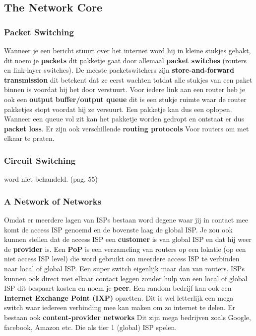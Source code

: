 \subsection{The Network Core}
\subsubsection{Packet Switching}
Wanneer je een bericht stuurt over het internet word hij in kleine stukjes gehakt, dit noem je \textbf{packets} dit pakketje gaat door allemaal \textbf{packet switches} (routers en link-layer switches).
\newline
De meeste packetswitchers zijn \textbf{store-and-forward transmission} dit betekent dat ze eerst wachten totdat alle stukjes van een paket binnen is voordat hij het door verstuurt. Voor iedere link aan een router heb je ook een \textbf{output buffer/output queue} dit is een stukje ruimte waar de router pakketjes stopt voordat hij ze versuurt. Een pakketje kan dus een  oplopen. Wanneer een queue vol zit kan het pakketje worden gedropt en ontstaat er dus \textbf{packet loss}.
\newline
Er zijn ook verschillende \textbf{routing protocols} Voor routers om met elkaar te praten. 
\subsubsection{Circuit Switching}
word niet behandeld. (pag. 55)

\subsubsection{A Network of Networks}
Omdat er meerdere lagen van ISPs bestaan word degene waar jij in contact mee komt de access ISP genoemd en de bovenste laag de global ISP. Je zou ook kunnen stellen dat de access ISP een \textbf{customer} is van global ISP en dat hij weer de \textbf{provider} is.
\newline
Een \textbf{PoP} is een verzameling van routers op een lokatie (op een niet access ISP level) die word gebruikt om meerdere access ISP te verbinden naar local of global ISP. Een super switch eigenlijk maar dan van routers.
ISPs kunnen ook direct met elkaar contact leggen zonder hulp van een local of global ISP dit bespaart kosten en noem je \textbf{peer}.
\newline
Een random bedrijf kan ook een \textbf{Internet Exchange Point (IXP)} opzetten. Dit is wel letterlijk een mega switch waar iedereen verbinding mee kan maken om zo internet te delen.
Er bestaan ook \textbf{content-provider networks} Dit zijn mega bedrijven zoals Google, facebook, Amazon etc. Die als tier 1 (global) ISP spelen.
